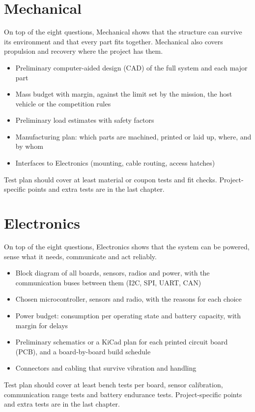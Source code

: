 \documentclass{../../Common/Latex/Templates/rapport}
\renewcommand{\vsection}[1]{\section{#1}}
\begin{document}
\vsection{Mechanical}
On top of the eight questions, Mechanical shows that the structure can survive its environment and that every part fits together. Mechanical also covers propulsion and recovery where the project has them.
\begin{itemize}
  \item Preliminary computer-aided design (CAD) of the full system and each major part
  \item Mass budget with margin, against the limit set by the mission, the host vehicle or the competition rules
  \item Preliminary load estimates with safety factors
  \item Manufacturing plan: which parts are machined, printed or laid up, where, and by whom
  \item Interfaces to Electronics (mounting, cable routing, access hatches)
\end{itemize}
Test plan should cover at least material or coupon tests and fit checks. Project-specific points and extra tests are in the last chapter.

\vsection{Electronics}
On top of the eight questions, Electronics shows that the system can be powered, sense what it needs, communicate and act reliably.
\begin{itemize}
  \item Block diagram of all boards, sensors, radios and power, with the communication buses between them (I2C, SPI, UART, CAN)
  \item Chosen microcontroller, sensors and radio, with the reasons for each choice
  \item Power budget: consumption per operating state and battery capacity, with margin for delays
  \item Preliminary schematics or a KiCad plan for each printed circuit board (PCB), and a board-by-board build schedule
  \item Connectors and cabling that survive vibration and handling
\end{itemize}
Test plan should cover at least bench tests per board, sensor calibration, communication range tests and battery endurance tests. Project-specific points and extra tests are in the last chapter.
\end{document}
